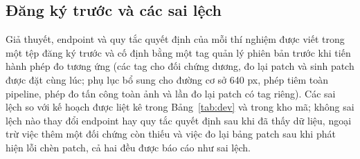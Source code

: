 \documentclass[a4paper,fleqn]{cas-dc}
\begin{document}
\subsection{Đăng ký trước và các sai lệch}
Giả thuyết, endpoint và quy tắc quyết định của mỗi thí nghiệm được viết trong một tệp đăng ký trước và cố định bằng một tag quản lý phiên bản trước khi tiến hành phép đo tương ứng (các tag cho đối chứng dương, đo lại patch và sinh patch được đặt cùng lúc; phụ lục bổ sung cho đường cơ sở 640 px, phép tiêm toàn pipeline, phép đo tấn công toàn ảnh và lần đo lại patch có tag riêng). Các sai lệch so với kế hoạch được liệt kê trong Bảng~\ref{tab:dev} và trong kho mã; không sai lệch nào thay đổi endpoint hay quy tắc quyết định sau khi đã thấy dữ liệu, ngoại trừ việc thêm một đối chứng còn thiếu và việc đo lại bảng patch sau khi phát hiện lỗi chèn patch, cả hai đều được báo cáo như sai lệch.
\end{document}

